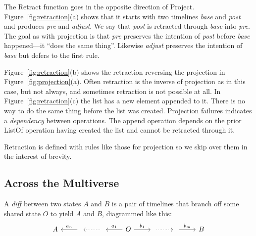 \documentclass[english,submission]{programming}
\theoremstyle{definition}
\begin{document}
The \textsf{Retract} function goes in the opposite direction of \textsf{Project}. Figure~\ref{fig:retraction}(a) shows that it starts with two timelines \textit{base} and \textit{post} and produces \textit{pre} and \textit{adjust}. We say that \textit{post} is retracted through \textit{base} into \textit{pre}. The goal as with projection is that \textit{pre} preserves the intention of \textit{post} before \textit{base} happened---it ``does the same thing''. Likewise \textit{adjust} preserves the intention of \textit{base} but defers to the first rule.

Figure~\ref{fig:retraction}(b) shows the retraction reversing the projection in Figure~\ref{fig:projection}(a). Often retraction is the inverse of projection as in this case, but not always, and sometimes retraction is not possible at all. In Figure~\ref{fig:retraction}(c) the list has a new element appended to it. There is no way to do the same thing before the list was created. Projection failures indicates a \textit{dependency} between operations. The \textsf{append} operation depends on the prior \textsf{ListOf} operation having created the list and cannot be retracted through it.

Retraction is defined with rules like those for projection so we skip over them in the interest of brevity.


\subsection{Across the Multiverse}\label{transfer}

A \textit{diff} between two states $A$ and $B$ is a pair of timelines that branch off some shared state $O$ to yield $A$ and $B$, diagrammed like this:
\[\begin{tikzcd}
	A & {} & {} & O & {} & {} & B
	\arrow["{{a_n}}"', from=1-2, to=1-1]
	\arrow[dotted, from=1-3, to=1-2]
	\arrow["{{a_1}}"', from=1-4, to=1-3]
	\arrow["{b_1}", from=1-4, to=1-5]
	\arrow[dotted, from=1-5, to=1-6]
	\arrow["{b_m}", from=1-6, to=1-7]
\end{tikzcd}\]
\end{document}
